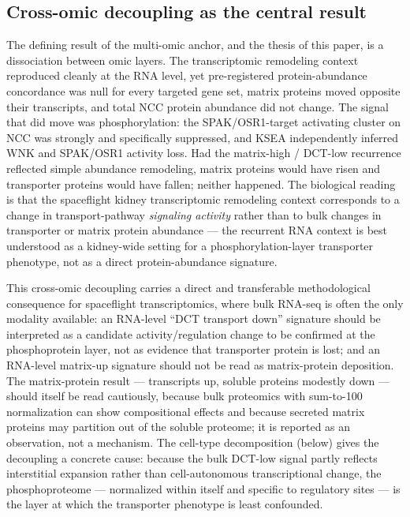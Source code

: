 \documentclass[11pt]{article}
\begin{document}
\subsection{Cross-omic decoupling as the central result}

The defining result of the multi-omic anchor, and the thesis of this paper, is a dissociation between omic layers. The transcriptomic remodeling context reproduced cleanly at the RNA level, yet pre-registered protein-abundance concordance was null for every targeted gene set, matrix proteins moved opposite their transcripts, and total NCC protein abundance did not change. The signal that did move was phosphorylation: the SPAK/OSR1-target activating cluster on NCC was strongly and specifically suppressed, and KSEA independently inferred WNK and SPAK/OSR1 activity loss. Had the matrix-high / DCT-low recurrence reflected simple abundance remodeling, matrix proteins would have risen and transporter proteins would have fallen; neither happened. The biological reading is that the spaceflight kidney transcriptomic remodeling context corresponds to a change in transport-pathway \emph{signaling activity} rather than to bulk changes in transporter or matrix protein abundance --- the recurrent RNA context is best understood as a kidney-wide setting for a phosphorylation-layer transporter phenotype, not as a direct protein-abundance signature.

This cross-omic decoupling carries a direct and transferable methodological consequence for spaceflight transcriptomics, where bulk RNA-seq is often the only modality available: an RNA-level ``DCT transport down'' signature should be interpreted as a candidate activity/regulation change to be confirmed at the phosphoprotein layer, not as evidence that transporter protein is lost; and an RNA-level matrix-up signature should not be read as matrix-protein deposition. The matrix-protein result --- transcripts up, soluble proteins modestly down --- should itself be read cautiously, because bulk proteomics with sum-to-100 normalization can show compositional effects and because secreted matrix proteins may partition out of the soluble proteome; it is reported as an observation, not a mechanism. The cell-type decomposition (below) gives the decoupling a concrete cause: because the bulk DCT-low signal partly reflects interstitial expansion rather than cell-autonomous transcriptional change, the phosphoproteome --- normalized within itself and specific to regulatory sites --- is the layer at which the transporter phenotype is least confounded.
\end{document}
